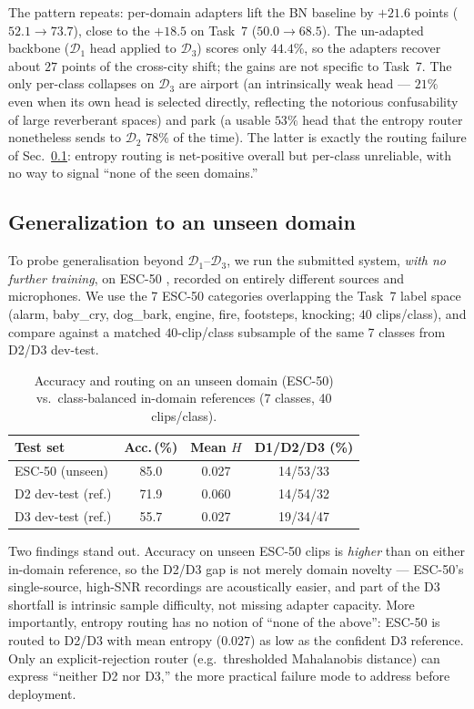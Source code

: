 \documentclass[9pt,conference]{IEEEtran}
\begin{document}
The pattern repeats: per-domain adapters lift the BN baseline by $+21.6$
points ($52.1\!\rightarrow\!73.7$), close to the $+18.5$ on Task~7
($50.0\!\rightarrow\!68.5$). The un-adapted backbone ($\mathcal{D}_1$ head
applied to $\mathcal{D}_3$) scores only $44.4\%$, so the adapters recover
about $27$ points of the cross-city shift; the gains are not specific to
Task~7. The only per-class collapses on $\mathcal{D}_3$ are airport (an
intrinsically weak head --- $21\%$ even when its own head is selected
directly, reflecting the notorious confusability of large reverberant
spaces) and park (a usable $53\%$ head that the entropy router nonetheless
sends to $\mathcal{D}_2$ $78\%$ of the time). The latter is exactly the
routing failure of Sec.~\ref{ssec:esc50}: entropy routing is net-positive
overall but per-class unreliable, with no way to signal ``none of the seen
domains.''

\subsection{Generalization to an unseen domain}
\label{ssec:esc50}

To probe generalisation beyond $\mathcal{D}_1$--$\mathcal{D}_3$, we run the
submitted system, \emph{with no further training}, on ESC-50
\cite{piczak2015esc50}, recorded on entirely different sources and
microphones. We use the 7 ESC-50 categories overlapping the Task~7 label
space (alarm, baby\_cry, dog\_bark, engine, fire, footsteps, knocking;
$40$ clips/class), and compare against a matched $40$-clip/class subsample
of the same 7 classes from D2/D3 dev-test.

\begin{table}[t]
  \centering
  \caption{Accuracy and routing on an unseen domain (ESC-50) vs.\
           class-balanced in-domain references (7 classes, 40 clips/class).}
  \label{tab:esc50}
  \begin{tabularx}{\columnwidth}{Xccc}
    \toprule
    Test set & Acc.\,(\%) & Mean $H$ & D1/D2/D3 (\%) \\
    \midrule
    ESC-50 (unseen)   & 85.0 & 0.027 & 14/53/33 \\
    D2 dev-test (ref.) & 71.9 & 0.060 & 14/54/32 \\
    D3 dev-test (ref.) & 55.7 & 0.027 & 19/34/47 \\
    \bottomrule
  \end{tabularx}
\end{table}

Two findings stand out. Accuracy on unseen ESC-50 clips is \emph{higher}
than on either in-domain reference, so the D2/D3 gap is not merely domain
novelty --- ESC-50's single-source, high-SNR recordings are acoustically
easier, and part of the D3 shortfall is intrinsic sample difficulty, not
missing adapter capacity. More importantly, entropy routing has no notion
of ``none of the above'': ESC-50 is routed to D2/D3 with mean entropy
($0.027$) as low as the confident D3 reference. Only an explicit-rejection
router (e.g.\ thresholded Mahalanobis distance) can express ``neither D2
nor D3,'' the more practical failure mode to address before deployment.
\end{document}
